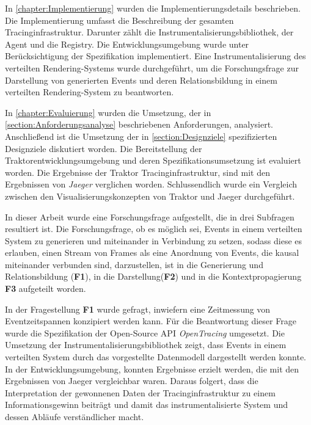 In \cref{chapter:Implementierung} wurden die Implementierungsdetails beschrieben. Die Implementierung umfasst die Beschreibung der gesamten Tracinginfrastruktur. Darunter zählt die Instrumentalisierungsbibliothek, der Agent und die Registry. Die Entwicklungsumgebung wurde unter Berücksichtigung der Spezifikation implementiert. Eine Instrumentalisierung des verteilten Rendering-Systems wurde durchgeführt, um die Forschungsfrage zur Darstellung von generierten Events und deren Relationsbildung in einem verteilten Rendering-System zu beantworten.

In \cref{chapter:Evaluierung} wurden die Umsetzung, der in \cref{section:Anforderungsanalyse} beschriebenen Anforderungen, analysiert. Anschließend ist die Umsetzung der in \cref{section:Designziele} spezifizierten Designziele diskutiert worden. Die Bereitstellung der Traktorentwicklungsumgebung und deren Spezifikationsumsetzung ist evaluiert worden. Die Ergebnisse der Traktor Tracinginfrastruktur, sind mit den Ergebnissen von \emph{Jaeger} verglichen worden. Schlussendlich wurde ein Vergleich zwischen den Visualisierungskonzepten von Traktor und Jaeger durchgeführt.

In dieser Arbeit wurde eine Forschungsfrage aufgestellt, die in drei Subfragen resultiert ist. Die Forschungsfrage, ob es möglich sei, Events in einem verteilten System zu generieren und miteinander in Verbindung zu setzen, sodass diese es erlauben, einen Stream von Frames als eine Anordnung von Events, die kausal miteinander verbunden sind, darzustellen, ist in die Generierung und Relationsbildung (\textbf{F1}), in die Darstellung(\textbf{F2}) und in die Kontextpropagierung \textbf{F3} aufgeteilt worden.

In der Fragestellung \textbf{F1} wurde gefragt, inwiefern eine Zeitmessung von Eventzeitspannen konzipiert werden kann. Für die Beantwortung dieser Frage wurde die Spezifikation der Open-Source API \emph{OpenTracing} umgesetzt. Die Umsetzung der Instrumentalisierungsbibliothek zeigt, dass Events in einem verteilten System durch das vorgestellte Datenmodell dargestellt werden konnte. In der Entwicklungsumgebung, konnten Ergebnisse erzielt werden, die mit den Ergebnissen von Jaeger vergleichbar waren. Daraus folgert, dass die Interpretation der gewonnenen Daten der Tracinginfrastruktur zu einem Informationsgewinn beiträgt und damit das instrumentalisierte System und dessen Abläufe verständlicher macht.

